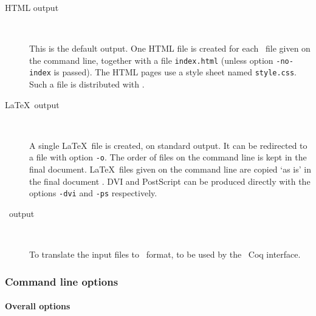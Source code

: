 \begin{description}
\item[HTML output] ~\par
  This is the default output.
  One HTML file is created for each \Coq\ file given on the command line,
  together with a file \texttt{index.html} (unless option
  \texttt{-no-index} is passed). The HTML pages use a style sheet
  named \texttt{style.css}. Such a file is distributed with \coqdoc.

\item[\LaTeX\ output] ~\par
  A single \LaTeX\ file is created, on standard output. It can be
  redirected to a file with option \texttt{-o}.
  The order of files on the command line is kept in the final
  document. \LaTeX\ files given on the command line are copied `as is'
  in the final document .
  DVI and PostScript can be produced directly with the options
  \texttt{-dvi} and \texttt{-ps} respectively.

\item[\texmacs\ output] ~\par
  To translate the input files to \texmacs\ format, to be used by
  the \texmacs\ Coq interface.
\end{description}


\subsubsection*{Command line options}


\paragraph{Overall options}

